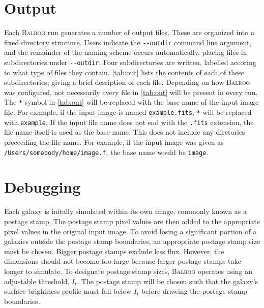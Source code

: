 \documentclass[12pt]{book}
\newcommand{\balrog}{\textsc{Balrog}}
\newcommand{\opt}[1]{{\texttt{-}\texttt{-#1}}}
\begin{document}
\chapter{Output}
\label{sec:out}
Each \balrog{} run generates a number of output files. 
These are organized into a fixed directory structure.
Users indicate the \opt{outdir} command line argument, and
the remainder of the naming scheme occurs automatically,
placing files in subdirectories under \opt{outdir}.
Four subdirectories are written, labelled accoring to what
type of files they contain. \autoref{tab:out}
lists the contents of each of these subdirectories,
giving a brief desription of each file. Depending on how
\balrog{} was configured, not necessarily every file
in \autoref{tab:out} will be present in every run.
The \texttt{*} symbol in \autoref{tab:out} will be replaced with
the base name of the input image file. For example,
if the input image is named \texttt{example.fits},
\texttt{*} will be replaced with \texttt{example}.
If the input file name does not end with the \texttt{.fits}
extension, the file name itself is used as the base name.
This does not include any diretories preceeding the file name.
For example, if the input image was given as
\texttt{/Users/somebody/home/image.f}, the
base name would be \texttt{image}.

\outtab{}

\chapter{Debugging}
\label{sec:debug}

Each galaxy is initally simulated within its own image, commonly known as a postage stamp.
The postage stamp pixel values are then added to the appropriate pixel values in the original input image.
To avoid losing a significant portion of a galaxies outside the postage stamp boundaries,
an appropriate postage stamp size must be chosen. 
Bigger postage stamps exclude less flux.
However, the dimensions should not become too large because
larger postage stamps take longer to simulate.
To designate postage stamp sizes, \balrog{} operates using an adjustable threshold, $I_t$.
The postage stamp will be chosen such that the galaxy's surface brightness profile
must fall below $I_t$ before drawing the postage stamp boundaries.
\end{document}
